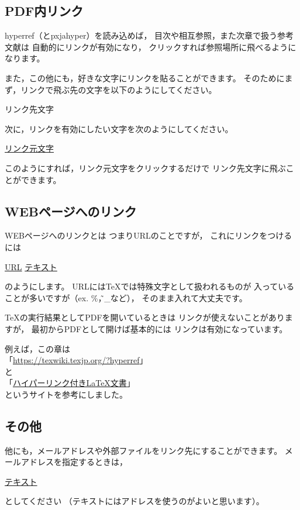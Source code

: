 \subsection{PDF内リンク}
hyperref（とpxjahyper）を読み込めば，
目次や相互参照，また次章で扱う参考文献は
自動的にリンクが有効になり，
クリックすれば参照場所に飛べるようになります。

また，この他にも，好きな文字にリンクを貼ることができます。
そのためにまず，リンクで飛ぶ先の文字を以下のようにしてください。
\begin{ITeX}
\hypertarget{リンク名}{リンク先文字}
\end{ITeX}
次に，リンクを有効にしたい文字を次のようにしてください。
\begin{ITeX}
\hyperlink{リンク名}{リンク元文字}
\end{ITeX}
このようにすれば，リンク元文字をクリックするだけで
リンク先文字に飛ぶことができます。


\subsection{WEBページへのリンク}
WEBページへのリンクとは
つまりURLのことですが，
これにリンクをつけるには
\begin{ITeX}
\url{URL}
\href{URL}{テキスト}
\end{ITeX}
のようにします。
URLには{\TeX}では特殊文字として扱われるものが
入っていることが多いですが（ex. \%，\~，\_など），
そのまま入れて大丈夫です。

{\TeX}の実行結果としてPDFを開いているときは
リンクが使えないことがありますが，
最初からPDFとして開けば基本的には
リンクは有効になっています。

例えば，この章は \\
「\url{https://texwiki.texjp.org/?hyperref}」\\
と \\
「\href{http://www.isc.meiji.ac.jp/~mizutani/tex/link_slide/hyperlink.html}{ハイパーリンク付きLaTeX文書}」\\
というサイトを参考にしました。


\subsection{その他}
他にも，メールアドレスや外部ファイルをリンク先にすることができます。
メールアドレスを指定するときは，
\begin{ITeX}
\href{mailto:アドレス}{テキスト}
\end{ITeX}
としてください
（テキストにはアドレスを使うのがよいと思います）。

